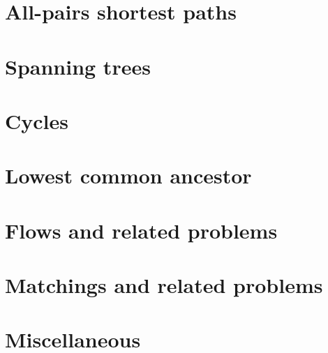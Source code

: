 \documentclass[11pt,a4paper,oneside]{book}
\begin{document}
\chapter{All-pairs shortest paths}


\chapter{Spanning trees}






\chapter{Cycles}



\chapter{Lowest common ancestor}





\chapter{Flows and related problems}









\chapter{Matchings and related problems}



\chapter{Miscellaneous}






\end{document}
